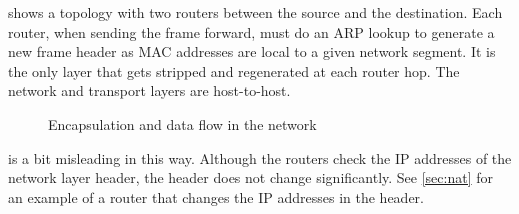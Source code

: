 { shows a topology with two routers between the source and the destination.
Each router, when sending the frame forward, must do an \acs{ARP} lookup to generate a new frame header as \acs{MAC} addresses are local to a given network segment.
It is the only layer that gets stripped and regenerated at each router hop.
The network and transport layers are host-to-host.


\begin{figure}[ht]
\centering

\caption{Encapsulation and data flow in the network}
\label{fig:data-flow}
\end{figure}


 is a bit misleading in this way.
Although the routers check the \acs{IP} addresses of the network layer header, the header does not change significantly.
See \vref{sec:nat} for an example of a router that changes the \acs{IP} addresses in the header.
}

\label{sec:network-icons}

